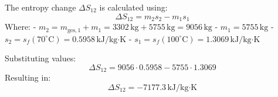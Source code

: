 The entropy change \( \Delta S_{12} \) is calculated using:  
\[
\Delta S_{12} = m_2 s_2 - m_1 s_1
\]  
Where:  
- \( m_2 = m_{\text{ges},1} + m_1 = 3302 \, \text{kg} + 5755 \, \text{kg} = 9056 \, \text{kg} \)  
- \( m_1 = 5755 \, \text{kg} \)  
- \( s_2 = s_f(70^\circ\text{C}) = 0.5958 \, \text{kJ/kg·K} \)  
- \( s_1 = s_f(100^\circ\text{C}) = 1.3069 \, \text{kJ/kg·K} \)  

Substituting values:  
\[
\Delta S_{12} = 9056 \cdot 0.5958 - 5755 \cdot 1.3069
\]  
Resulting in:  
\[
\Delta S_{12} = -7177.3 \, \text{kJ/kg·K}
\]